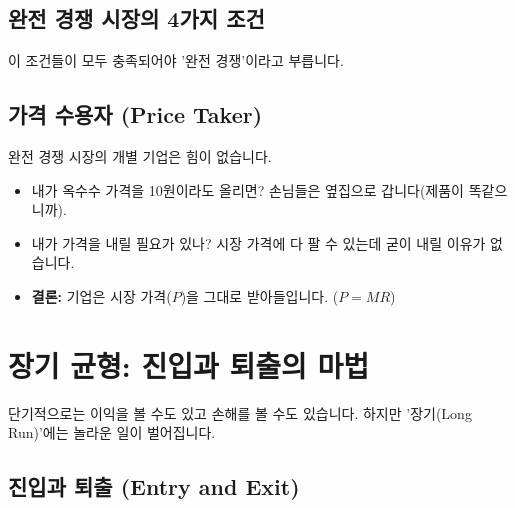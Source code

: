 \documentclass[11pt,a4paper]{book}
\begin{document}
\subsection{완전 경쟁 시장의 4가지 조건}
이 조건들이 모두 충족되어야 '완전 경쟁'이라고 부릅니다.

\begin{table}[h!]
\centering
\caption{완전 경쟁 시장의 4대 조건}
\label{tab:perfect_comp}
\end{table}

\subsection{가격 수용자 (Price Taker)}
완전 경쟁 시장의 개별 기업은 힘이 없습니다.
\begin{itemize}
    \item 내가 옥수수 가격을 10원이라도 올리면? 손님들은 옆집으로 갑니다(제품이 똑같으니까).
    \item 내가 가격을 내릴 필요가 있나? 시장 가격에 다 팔 수 있는데 굳이 내릴 이유가 없습니다.
    \item \textbf{결론:} 기업은 시장 가격($P$)을 그대로 받아들입니다. ($P = MR$)
\end{itemize}

\section{장기 균형: 진입과 퇴출의 마법}

단기적으로는 이익을 볼 수도 있고 손해를 볼 수도 있습니다. 하지만 '장기(Long Run)'에는 놀라운 일이 벌어집니다.

\subsection{진입과 퇴출 (Entry and Exit)}
\end{document}
